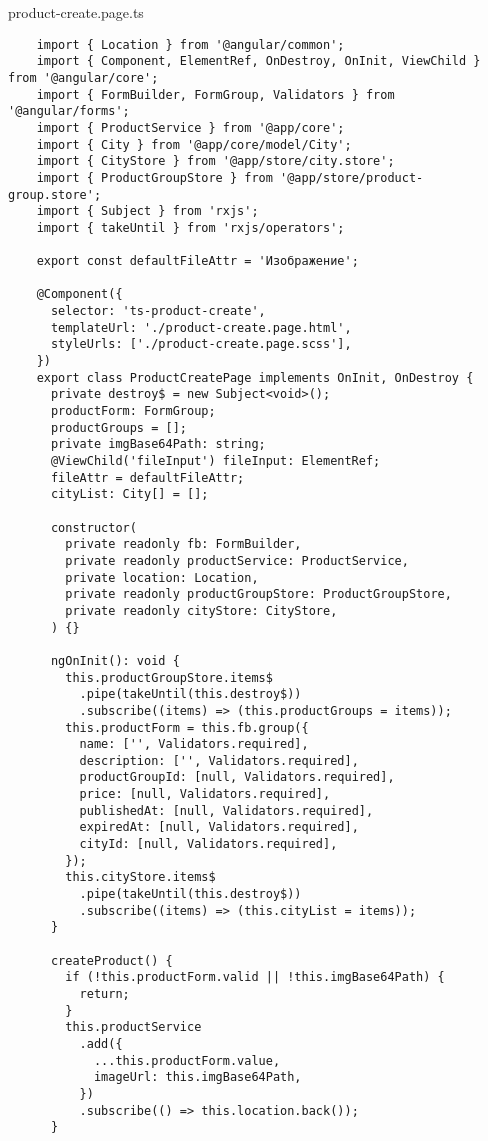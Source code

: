 product-create.page.ts
\begin{lstlisting}
    import { Location } from '@angular/common';
    import { Component, ElementRef, OnDestroy, OnInit, ViewChild } from '@angular/core';
    import { FormBuilder, FormGroup, Validators } from '@angular/forms';
    import { ProductService } from '@app/core';
    import { City } from '@app/core/model/City';
    import { CityStore } from '@app/store/city.store';
    import { ProductGroupStore } from '@app/store/product-group.store';
    import { Subject } from 'rxjs';
    import { takeUntil } from 'rxjs/operators';
    
    export const defaultFileAttr = 'Изображение';
    
    @Component({
      selector: 'ts-product-create',
      templateUrl: './product-create.page.html',
      styleUrls: ['./product-create.page.scss'],
    })
    export class ProductCreatePage implements OnInit, OnDestroy {
      private destroy$ = new Subject<void>();
      productForm: FormGroup;
      productGroups = [];
      private imgBase64Path: string;
      @ViewChild('fileInput') fileInput: ElementRef;
      fileAttr = defaultFileAttr;
      cityList: City[] = [];
    
      constructor(
        private readonly fb: FormBuilder,
        private readonly productService: ProductService,
        private location: Location,
        private readonly productGroupStore: ProductGroupStore,
        private readonly cityStore: CityStore,
      ) {}
    
      ngOnInit(): void {
        this.productGroupStore.items$
          .pipe(takeUntil(this.destroy$))
          .subscribe((items) => (this.productGroups = items));
        this.productForm = this.fb.group({
          name: ['', Validators.required],
          description: ['', Validators.required],
          productGroupId: [null, Validators.required],
          price: [null, Validators.required],
          publishedAt: [null, Validators.required],
          expiredAt: [null, Validators.required],
          cityId: [null, Validators.required],
        });
        this.cityStore.items$
          .pipe(takeUntil(this.destroy$))
          .subscribe((items) => (this.cityList = items));
      }
    
      createProduct() {
        if (!this.productForm.valid || !this.imgBase64Path) {
          return;
        }
        this.productService
          .add({
            ...this.productForm.value,
            imageUrl: this.imgBase64Path,
          })
          .subscribe(() => this.location.back());
      }
    

\end{lstlisting}
